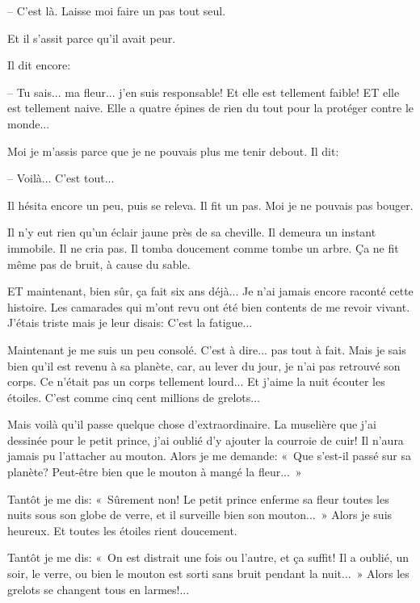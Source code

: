\documentclass[a4paper]{report}
\begin{document}
-- C'est là. Laisse moi faire un pas tout seul.

Et il s'assit parce qu'il avait peur. 


Il dit encore:

-- Tu sais... ma fleur... j'en suis responsable! Et elle est tellement faible! ET elle est tellement naive. Elle a quatre épines de rien du tout pour la protéger contre le monde... 


Moi je m'assis parce que je ne pouvais plus me tenir debout. Il dit:

-- Voilà... C'est tout...

Il hésita encore un peu, puis se releva. Il fit un pas. Moi je ne pouvais pas bouger.

Il n'y eut rien qu'un éclair jaune près de sa cheville. Il demeura un instant immobile. Il ne cria pas. Il tomba doucement comme tombe un arbre. Ça ne fit même pas de bruit, à cause du sable. 


\parachapter{} %

ET maintenant, bien sûr, ça fait six ans déjà... Je n'ai jamais encore raconté cette histoire. Les camarades qui m'ont revu ont été bien contents de me revoir vivant. J'étais triste mais je leur disais: C'est la fatigue...

Maintenant je me suis un peu consolé. C'est à dire... pas tout à fait. Mais je sais bien qu'il est revenu à sa planète, car, au lever du jour, je n'ai pas retrouvé son corps. Ce n'était pas un corps tellement lourd... Et j'aime la nuit écouter les étoiles. C'est comme cinq cent millions de grelots...

Mais voilà qu'il passe quelque chose d'extraordinaire. La muselière que j'ai dessinée pour le petit prince, j'ai oublié d'y ajouter la courroie de cuir! Il n'aura jamais pu l'attacher au mouton. Alors je me demande: «~Que s'est-il passé sur sa planète? Peut-être bien que le mouton à mangé la fleur...~»

Tantôt je me dis: «~Sûrement non! Le petit prince enferme sa fleur toutes les nuits sous son globe de verre, et il surveille bien son mouton...~» Alors je suis heureux. Et toutes les étoiles rient doucement.

Tantôt je me dis: «~On est distrait une fois ou l'autre, et ça suffit! Il a oublié, un soir, le verre, ou bien le mouton est sorti sans bruit pendant la nuit...~» Alors les grelots se changent tous en larmes!...
\end{document}

